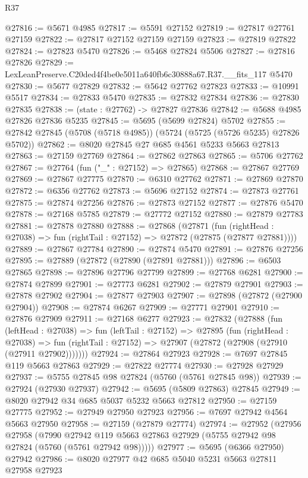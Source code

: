 \begin{lexlean}{R37}
\begin{coremodule}
@27816 := @5671 @4985
@27817 := @5591 @27152
@27819 := @27817 @27761 @27159
@27822 := @27817 @27152 @27159 @27159
@27823 := @27819 @27822
@27824 := @27823 @5470
@27826 := @5468 @27824 @5506
@27827 := @27816 @27826
@27829 := LexLeanPreserve.C20ded4f4be0e5011a640fb6c30888a67.R37.__fits_117 @5470
@27830 := @5677 @27829
@27832 := @5642 @27762 @27823
@27833 := @10991 @5517
@27834 := @27833 @5470
@27835 := @27832 @27834
@27836 := @27830 @27835
@27838 := (state : @27762) -> @27827 @27836
@27842 := @5688 @4985 @27826 @27836 @5235
@27845 := @5695 (@5699 @27824) @5702
@27855 := @27842 @27845 (@5708 (@5718 @4985)) (@5724 (@5725 (@5726 @5235) @27826 @5702))
@27862 := @8020 @27845 @27 @685 @4561 @5233 @5663 @27813
@27863 := @27159 @27769
@27864 := @27862 @27863
@27865 := @5706 @27762
@27867 := @27764 (fun ("_" : @27152) => @27865)
@27868 := @27867 @27769
@27869 := @27867 @27775
@27870 := @6310 @27762
@27871 := @27869 @27870
@27872 := @6356 @27762
@27873 := @5696 @27152
@27874 := @27873 @27761
@27875 := @27874 @27256
@27876 := @27873 @27152
@27877 := @27876 @5470
@27878 := @27168 @5785
@27879 := @27772 @27152
@27880 := @27879 @27783
@27881 := @27878 @27880
@27888 := @27868
    (@27871
      (fun (rightHead : @27038) => fun (rightTail : @27152) => @27872 (@27875 (@27877 @27881))))
@27889 := @27867 @27784
@27890 := @27874 @5470
@27891 := @27876 @27256
@27895 := @27889 (@27872 (@27890 (@27891 @27881)))
@27896 := @6503 @27865
@27898 := @27896 @27796 @27799
@27899 := @27768 @6281
@27900 := @27874 @27899
@27901 := @27773 @6281
@27902 := @27879 @27901
@27903 := @27878 @27902
@27904 := @27877 @27903
@27907 := @27898 (@27872 (@27900 @27904))
@27908 := @27874 @6267
@27909 := @27771 @27901
@27910 := @27876 @27909
@27911 := @27168 @6277
@27923 := @27832
    (@27888
      (fun (leftHead : @27038) =>
      fun (leftTail : @27152) =>
      @27895
        (fun (rightHead : @27038) =>
        fun (rightTail : @27152) => @27907 (@27872 (@27908 (@27910 (@27911 @27902)))))))
@27924 := @27864 @27923
@27928 := @7697 @27845 @119 @5663 @27863
@27929 := @27822 @27774
@27930 := @27928 @27929
@27937 := @5755 @27845 @98 @27824 (@5760 (@5761 @27845 @98))
@27939 := @27924 (@27930 @27937)
@27942 := @5695 (@5809 @27863) @27845
@27949 := @8020 @27942 @34 @685 @5037 @5232 @5663 @27812
@27950 := @27159 @27775
@27952 := @27949 @27950 @27923
@27956 := @7697 @27942 @4564 @5663 @27950
@27958 := @27159 (@27879 @27774)
@27974 := @27952
    (@27956
      @27958
      (@7990 @27942 @119 @5663 @27863 @27929 (@5755 @27942 @98 @27824 (@5760 (@5761 @27942 @98)))))
@27977 := @5695 (@6366 @27950) @27942
@27986 := @8020 @27977 @42 @685 @5040 @5231 @5663 @27811 @27958 @27923

\end{coremodule}
\end{lexlean}
